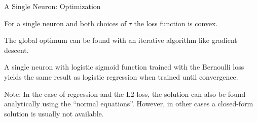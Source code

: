 \documentclass[11pt,compress,t,notes=noshow, xcolor=table]{beamer}
\begin{document}
\begin{framei} {A Single Neuron: Optimization}
\item For a single neuron and both choices of $\tau$ the loss function is convex.
\item The global optimum can be found with an iterative algorithm like gradient descent. 
\item A single neuron with logistic sigmoid function trained with the Bernoulli loss %
 yields the %
 same result as logistic regression when trained until convergence.
\item Note: In the case of regression and the L2-loss, the solution can
also be found analytically using the “normal equations”. However, in other cases a closed-form solution is usually not available.
\end{framei} 

\endlecture
\end{document}
